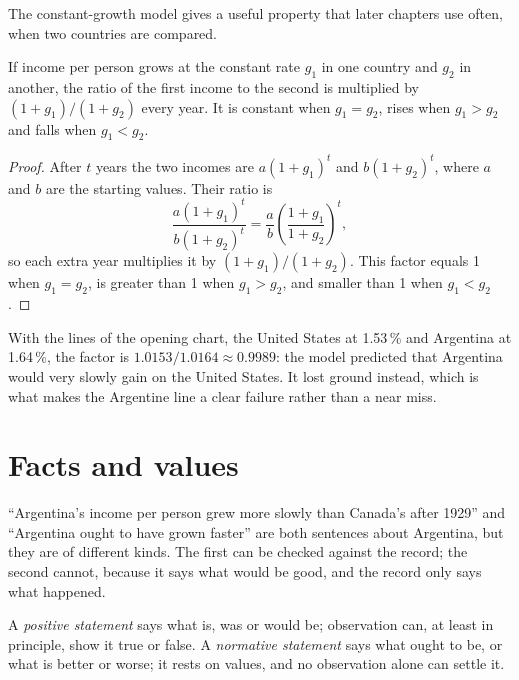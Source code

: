 The constant-growth model gives a useful property that later chapters use often, when two
countries are compared.

\begin{proposition}\label{prop:g10:economic-models:ratio}
If income per person grows at the constant rate $g_1$ in one country and $g_2$ in another, the
ratio of the first income to the second is multiplied by $(1+g_1)/(1+g_2)$ every year. It is
constant when $g_1 = g_2$, rises when $g_1 > g_2$ and falls when $g_1 < g_2$.
\end{proposition}
\begin{proof}
After $t$ years the two incomes are $a(1+g_1)^t$ and $b(1+g_2)^t$, where $a$ and $b$ are the
starting values. Their ratio is
\[
  \frac{a(1+g_1)^t}{b(1+g_2)^t} = \frac{a}{b}\left(\frac{1+g_1}{1+g_2}\right)^{t},
\]
so each extra year multiplies it by $(1+g_1)/(1+g_2)$. This factor equals 1 when $g_1 = g_2$, is
greater than 1 when $g_1 > g_2$, and smaller than 1 when $g_1 < g_2$.
\end{proof}

With the lines of the opening chart, the United States at 1.53\,\% and Argentina at 1.64\,\%, the
factor is $1.0153/1.0164 \approx 0.9989$: the model predicted that Argentina would very slowly
gain on the United States. It lost ground instead, which is what makes the Argentine line a clear
failure rather than a near miss.

\section{Facts and values}\label{sec:g10:economic-models:facts-values}

``Argentina's income per person grew more slowly than Canada's after 1929'' and ``Argentina ought
to have grown faster'' are both sentences about Argentina, but they are of different kinds. The
first can be checked against the record; the second cannot, because it says what would be good,
and the record only says what happened.

\begin{definition}\label{def:g10:economic-models:positive}
A \emph{positive statement} says what is, was or would be; observation
can, at least in principle, show it true or false. A \emph{normative statement} says what ought to be, or what is better or worse; it rests on values, and no
observation alone can settle it.
\end{definition}
\label{def:g10:economic-models:normative}

